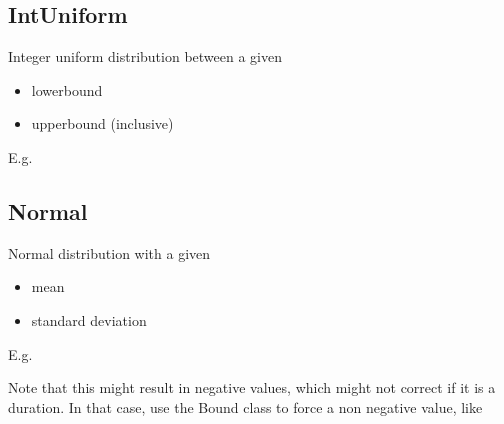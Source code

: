 \documentclass[letterpaper,10pt,english]{sphinxmanual}
\begin{document}
\subsection{IntUniform}
\label{\detokenize{Distributions:intuniform}}
Integer uniform distribution between a given
\begin{itemize}
\item {} 
lowerbound

\item {} 
upperbound (inclusive)

\end{itemize}

E.g.

%
\begin{sphinxVerbatim}[commandchars=\\\{\}]
   
\end{sphinxVerbatim}


\subsection{Normal}
\label{\detokenize{Distributions:normal}}
Normal distribution with a given
\begin{itemize}
\item {} 
mean

\item {} 
standard deviation

\end{itemize}

E.g.

%
\begin{sphinxVerbatim}[commandchars=\\\{\}]
     
\end{sphinxVerbatim}

Note that this might result in negative values, which might not correct if it is a duration. In that case,
use the Bound class to force a non negative value, like

%
\begin{sphinxVerbatim}[commandchars=\\\{\}]
  
   
\end{sphinxVerbatim}
\end{document}
